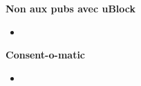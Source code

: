 \documentclass[a0paper,portrait]{baposter}
\begin{document}
\begin{poster}
{  \vspace{0.5em}

  \noindent
  \begin{minipage}[t]{0.28\linewidth}
  \end{minipage}%
  \begin{minipage}[t]{0.7\linewidth}
    \hspace{0.5em}
    \textbf{\color{c4dtblue}Non aux pubs avec uBlock}
    \begin{itemize}
      \item 
    \end{itemize}
  \end{minipage}

  \vspace{0.5em}

  \noindent
  \begin{minipage}[t]{0.7\linewidth}
    \textbf{\color{c4dtblue}Consent-o-matic}
    \begin{itemize}
      \item 
    \end{itemize}
  \end{minipage}%
  \begin{minipage}[t]{0.28\linewidth}
    \hspace{0.5em}
  \end{minipage}
}

  
  
  
  

\end{poster}
\end{document}
